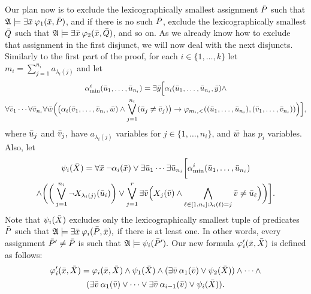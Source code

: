 \begin{enumerate}
	Our plan now is to exclude the lexicographically smallest assignment $\P$ such that $\A\models\exists\x\:\varphi_1(\x,\P)$, and if there is no such $\P$, exclude the lexicographically smallest $\Q$ such that $\A\models\exists\x\:\varphi_2(\x,\Q)$, and so on. As we already know how to exclude that assignment in the first disjunct, we will now deal with the next disjuncts. Similarly to the first part of the proof, for each $i\in\{1,\ldots,k\}$ let $m_i = \sum_{j = 1}^{n_i} a_{\lambda_i(j)}$ and let
	\begin{multline*}
	\alpha^i_{\min}(\u_1,\dots,\u_{n_i}) = \exists\y\Big[ \alpha_i(\u_1,\dots,\u_{n_i},\y)\wedge \\ \forall\v_1\cdots\forall\v_{n_i}\forall\w\Big(\big(\alpha_i(\v_1,\dots,\v_{n_i},\w)\wedge\bigvee_{j=1}^{n_i}(\u_j\neq\v_j)\big)\to \varphi_{m_i,<}((\u_1,\dots,\u_{n_i}),(\v_1,\dots,\v_{n_i}))\Big)\Big],
	\end{multline*}
	where $\u_j$ and $\v_j,$ have $a_{\lambda_i(j)}$ variables for $j\in\{1,\ldots,n_i\}$, and $\w$ has $p_i$ variables. Also, let
	\begin{multline*}
	\psi_i(\X) = \forall\x\:\neg\alpha_i(\x) \vee \exists\u_1\cdots\exists\u_{n_i}\bigg[\alpha^i_{\min}(\u_1,\dots,\u_{n_i}) \\ \wedge \bigg(\bigg(\bigvee_{j = 1}^{n_i}\neg X_{\lambda_i(j)}(\u_i) \bigg) \vee \bigvee_{j=1}^r \exists \v\Big( X_j(\v) \wedge \bigwedge_{\ell\in[1,n_i]: \lambda_i(\ell) = j} \v \neq \u_\ell\Big) \bigg) \bigg].
	\end{multline*}
	Note that $\psi_i(\X)$ excludes only the lexicographically smallest tuple of predicates $\P$ such that $\A\models\exists\x\:\varphi_i(\P,\x),$ if there is at least one. In other words, every assignment $\P^\prime \neq \P$ is such that $\A\models\psi_i(\P^\prime).$ Our new formula $\varphi_i^\prime(\x,\X)$ is defined as follows:
	\begin{multline}
	\varphi_i^\prime(\x,\X) = \varphi_i(\x,\X) \wedge \psi_1(\X) \wedge (\exists\v\:\alpha_1(\v)\vee\psi_2(\X)) \wedge \cdots \wedge \\ (\exists\v\:\alpha_1(\v)\vee\cdots\vee\exists\v\:\alpha_{i-1}(\v)\vee\psi_i(\X)).
	\end{multline}

\end{enumerate}
